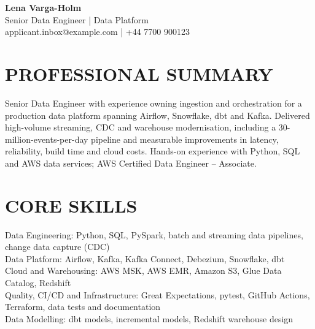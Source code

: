 \documentclass[11pt,a4paper]{article}
\begin{document}
\begin{center}
{\Huge\bfseries\color{primarycolor} Lena Varga-Holm}\\[0.3em]
{\large\color{accentcolor} Senior Data Engineer | Data Platform}\\[0.3em]
applicant.inbox@example.com | +44 7700 900123
\end{center}
\vspace{0.4em}

\section*{PROFESSIONAL SUMMARY}
Senior Data Engineer with experience owning ingestion and orchestration for a production data platform spanning Airflow, Snowflake, dbt and Kafka. Delivered high-volume streaming, CDC and warehouse modernisation, including a 30-million-events-per-day pipeline and measurable improvements in latency, reliability, build time and cloud costs. Hands-on experience with Python, SQL and AWS data services; AWS Certified Data Engineer – Associate.

\section*{CORE SKILLS}
Data Engineering: Python, SQL, PySpark, batch and streaming data pipelines, change data capture (CDC)\\
Data Platform: Airflow, Kafka, Kafka Connect, Debezium, Snowflake, dbt\\
Cloud and Warehousing: AWS MSK, AWS EMR, Amazon S3, Glue Data Catalog, Redshift\\
Quality, CI/CD and Infrastructure: Great Expectations, pytest, GitHub Actions, Terraform, data tests and documentation\\
Data Modelling: dbt models, incremental models, Redshift warehouse design
\end{document}
